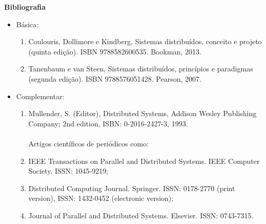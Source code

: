 




%
%
%


\begin{snugshade}\begin{center}\textbf{
    Bibliografia
}\end{center}\end{snugshade}

\begin{itemize} 
  \item Básica:
	\begin{enumerate}
		\item Coulouris, Dollimore e Kindberg, Sistemas distribuídos, conceito e projeto (quinta edição). ISBN 9788582600535. Bookman, 2013.
		\item Tanenbaum e van Steen, Sistemas distribuídos, princípios e paradigmas (segunda edição). ISBN 9788576051428. Pearson, 2007.
	\end{enumerate}
  \item Complementar:
	\begin{enumerate} 
		\item Mullender, S. (Editor), Distributed Systems, Addison Wesley Publishing Company; 2nd edition, ISBN: 0-2016-2427-3, 1993.\\
        \\
	Artigos cient\'ificos de peri\'odicos como: 
		\item IEEE Transactions on Parallel and Distributed Systems. IEEE Computer Society. ISSN: 1045-9219;
		\item Distributed Computing Journal. Springer. ISSN: 0178-2770 (print version), ISSN: 1432-0452 (electronic version);
		\item Journal of Parallel and Distributed Systems. Elsevier. ISSN: 0743-7315.
	\end{enumerate}
\end{itemize}
